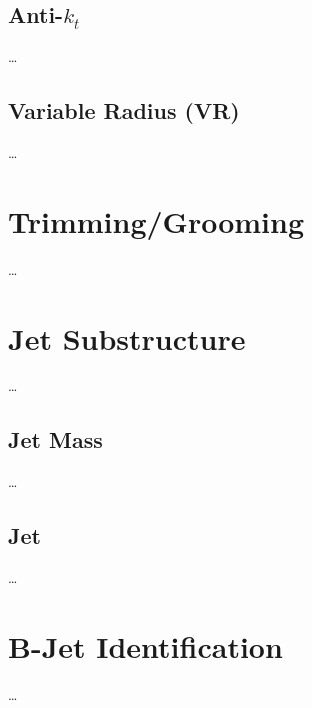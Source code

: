 \subsection{Anti-$k_t$}
\cite{Cacciari:2008gp}
\dots

\subsection{Variable Radius (VR)}
\cite{ATL-PHYS-PUB-2017-010}
\dots

\section{Trimming/Grooming}
\cite{ATLAS-CONF-2012-065}
\dots

\section{Jet Substructure}
\dots

\subsection{Jet Mass}
\dots
\subsection{Jet \Dtwo}
\dots

\section{B-Jet Identification}
\dots